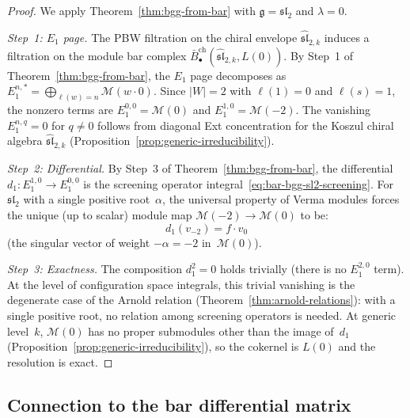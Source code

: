 \begin{proof}
We apply Theorem~\ref{thm:bgg-from-bar} with
$\mathfrak{g} = \mathfrak{sl}_2$ and $\lambda = 0$.

\emph{Step~1: $E_1$ page.}
The PBW filtration on the chiral envelope
$\widehat{\mathfrak{sl}}_{2,k}$ induces a filtration on
the module bar complex
$\bar{B}_\bullet^{\mathrm{ch}}(\widehat{\mathfrak{sl}}_{2,k},
L(0))$.  By Step~1 of Theorem~\ref{thm:bgg-from-bar},
the $E_1$ page decomposes as
$E_1^{n,*} = \bigoplus_{\ell(w) = n} \mathcal{M}(w \cdot 0)$.
Since $|W| = 2$ with $\ell(1) = 0$ and $\ell(s) = 1$,
the nonzero terms are $E_1^{0,0} = \mathcal{M}(0)$ and
$E_1^{1,0} = \mathcal{M}(-2)$.  The vanishing
$E_1^{n,q} = 0$ for $q \neq 0$ follows from diagonal
Ext concentration for the Koszul chiral algebra
$\widehat{\mathfrak{sl}}_{2,k}$
(Proposition~\ref{prop:generic-irreducibility}).

\emph{Step~2: Differential.}
By Step~3 of Theorem~\ref{thm:bgg-from-bar}, the
differential $d_1\colon E_1^{1,0} \to E_1^{0,0}$
is the screening operator integral~\eqref{eq:bar-bgg-sl2-screening}.
For $\mathfrak{sl}_2$ with a single positive root~$\alpha$,
the universal property of Verma modules forces the unique
(up to scalar) module map
$\mathcal{M}(-2) \to \mathcal{M}(0)$ to be:
\[
d_1(v_{-2}) = f \cdot v_0
\]
(the singular vector of weight $-\alpha = -2$
in~$\mathcal{M}(0)$).

\emph{Step~3: Exactness.}
The composition $d_1^2 = 0$ holds trivially
(there is no $E_1^{2,0}$ term).  At the level of
configuration space integrals, this trivial vanishing
is the degenerate case of the Arnold relation
(Theorem~\ref{thm:arnold-relations}): with a single
positive root, no relation among screening operators
is needed.  At generic level~$k$, $\mathcal{M}(0)$
has no proper submodules other than the image of~$d_1$
(Proposition~\ref{prop:generic-irreducibility}), so the
cokernel is $L(0)$ and the resolution is exact.
\end{proof}


\subsection{Connection to the bar differential matrix}

